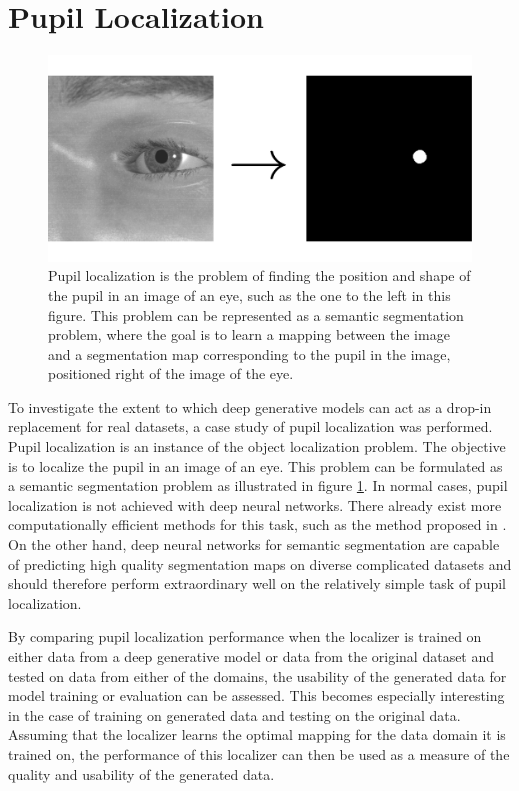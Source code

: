 \section{Pupil Localization}
\begin{figure}[t]
    \centering
    \includegraphics[width=\textwidth]{images/misc/pupil-localization.pdf}
    \caption{Pupil localization is the problem of finding the position and shape of the pupil in an image of an eye, such as the one to the left in this figure. This problem can be represented as a semantic segmentation problem, where the goal is to learn a mapping between the image and a segmentation map corresponding to the pupil in the image, positioned right of the image of the eye.}
    \label{fig:pupillocalization}
\end{figure}
To investigate the extent to which deep generative models can act as a drop-in replacement for real datasets, a case study of pupil localization was performed. Pupil localization is an instance of the object localization problem. The objective is to localize the pupil in an image of an eye. This problem can be formulated as a semantic segmentation problem as illustrated in figure \ref{fig:pupillocalization}. In normal cases, pupil localization is not achieved with deep neural networks. There already exist more computationally efficient methods for this task, such as the method proposed in \parencite{markuvs2014eye}. On the other hand, deep neural networks for semantic segmentation are capable of predicting high quality segmentation maps on diverse complicated datasets \parencite{ChenPK0Y16semantic} and should therefore perform extraordinary well on the relatively simple task of pupil localization.

By comparing pupil localization performance when the localizer is trained on either data from a deep generative model or data from the original dataset and tested on data from either of the domains, the usability of the generated data for model training or evaluation can be assessed. This becomes especially interesting in the case of training on generated data and testing on the original data. Assuming that the localizer learns the optimal mapping for the data domain it is trained on, the performance of this localizer can then be used as a measure of the quality and usability of the generated data. 

